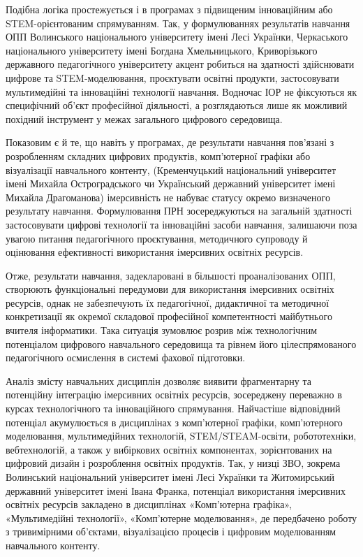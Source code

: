 Подібна логіка простежується і в програмах з підвищеним інноваційним або STEM-орієнтованим спрямуванням. Так, у формулюваннях результатів навчання ОПП Волинського національного університету імені Лесі Українки, Черкаського національного університету імені Богдана Хмельницького, Криворізького державного педагогічного університету акцент робиться на здатності здійснювати цифрове та STEM-моделювання, проєктувати освітні продукти, застосовувати мультимедійні та інноваційні технології навчання. Водночас ІОР не фіксуються як специфічний об'єкт професійної діяльності, а розглядаються лише як можливий похідний інструмент у межах загального цифрового середовища.

Показовим є й те, що навіть у програмах, де результати навчання пов'язані з розробленням складних цифрових продуктів, комп'ютерної графіки або візуалізації навчального контенту, (Кременчуцький національний університет імені Михайла Остроградського чи Український державний університет імені Михайла Драгоманова) імерсивність не набуває статусу окремо визначеного результату навчання. Формулювання ПРН зосереджуються на загальній здатності застосовувати цифрові технології та інноваційні засоби навчання, залишаючи поза увагою питання педагогічного проєктування, методичного супроводу й оцінювання ефективності використання імерсивних освітніх ресурсів.

Отже, результати навчання, задекларовані в більшості проаналізованих ОПП, створюють функціональні передумови для використання імерсивних освітніх ресурсів, однак не забезпечують їх педагогічної, дидактичної та методичної конкретизації як окремої складової професійної компетентності майбутнього вчителя інформатики. Така ситуація зумовлює розрив між технологічним потенціалом цифрового навчального середовища та рівнем його цілеспрямованого педагогічного осмислення в системі фахової підготовки.

Аналіз змісту навчальних дисциплін дозволяє виявити фрагментарну та потенційну інтеграцію імерсивних освітніх ресурсів, зосереджену переважно в курсах технологічного та інноваційного спрямування. Найчастіше відповідний потенціал акумулюється в дисциплінах з комп'ютерної графіки, комп'ютерного моделювання, мультимедійних технологій, STEM/STEAM-освіти, робототехніки, вебтехнологій, а також у вибіркових освітніх компонентах, зорієнтованих на цифровий дизайн і розроблення освітніх продуктів. Так, у низці ЗВО, зокрема Волинський національний університет імені Лесі Українки та Житомирський державний університет імені Івана Франка, потенціал використання імерсивних освітніх ресурсів закладено в дисциплінах «Комп'ютерна графіка», «Мультимедійні технології», «Комп'ютерне моделювання», де передбачено роботу з тривимірними об'єктами, візуалізацією процесів і цифровим моделюванням навчального контенту.

